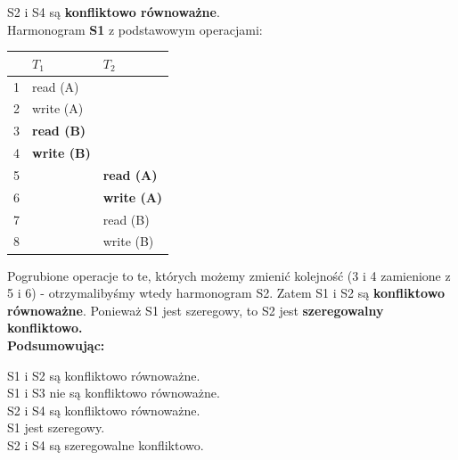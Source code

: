\documentclass[12pt]{article}
\begin{document}
    S2 i S4 są \textbf{konfliktowo równoważne}.\\


    \noindent Harmonogram \textbf{S1} z podstawowym operacjami:
    \begin{table}[H]
        \begin{center}
            \begin{tabular}{| p{0.8cm} | p{6cm} | p{6cm} |}
                \hline
                & $T_1$ & $T_2$\\
                \hline
                \hline
                1 & read (A) &\\
                \hline
                2 & write (A) &\\
                \hline
                3 & \textbf{read (B)}&\\
                \hline
                4 & \textbf{write (B)}&\\
                \hline
                5 & & \textbf{read (A)}\\
                \hline
                6 & & \textbf{write (A)}\\
                \hline
                7 & & read (B)\\
                \hline
                8 & & write (B)\\
                \hline
            \end{tabular}
        \end{center}
    \end{table}

    Pogrubione operacje to te, których możemy zmienić kolejność (3 i 4 zamienione z 5 i 6) - otrzymalibyśmy wtedy
    harmonogram S2. Zatem S1 i S2 są \textbf{konfliktowo równoważne}. Ponieważ S1 jest szeregowy, to S2 jest
    \textbf{szeregowalny konfliktowo.}\\

    \textbf{Podsumowując:}
    \begin{center}
        S1 i S2 są konfliktowo równoważne.\\
        S1 i S3 nie są konfliktowo równoważne.\\
        S2 i S4 są konfliktowo równoważne.\\
        S1 jest szeregowy.\\
        S2 i S4 są szeregowalne konfliktowo.\\
    \end{center}
\end{document}
